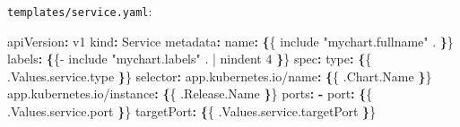 \documentclass[11pt]{article}
\newenvironment{Shaded}{\begin{snugshade}}{\end{snugshade}}
\newcommand{\AttributeTok}[1]{\textcolor[rgb]{0.16,0.50,0.73}{#1}}
\newcommand{\FunctionTok}[1]{\textcolor[rgb]{0.56,0.27,0.68}{#1}}
\newcommand{\KeywordTok}[1]{\textcolor[rgb]{0.81,0.81,0.76}{\textbf{#1}}}
\newcommand{\StringTok}[1]{\textcolor[rgb]{0.96,0.31,0.31}{#1}}
\begin{document}
\begin{Shaded}
\end{Shaded}

\texttt{templates/service.yaml}:


\begin{Shaded}
\begin{Highlighting}[]
\FunctionTok{apiVersion}\KeywordTok{:}\AttributeTok{ v1}
\FunctionTok{kind}\KeywordTok{:}\AttributeTok{ Service}
\FunctionTok{metadata}\KeywordTok{:}
\AttributeTok{  }\FunctionTok{name}\KeywordTok{:}\AttributeTok{ }\KeywordTok{\{}\AttributeTok{\{ include }\StringTok{"mychart.fullname"}\AttributeTok{ . }\KeywordTok{\}}\AttributeTok{\}}
\AttributeTok{  }\FunctionTok{labels}\KeywordTok{:}
\AttributeTok{    }\KeywordTok{\{}\AttributeTok{\{{-} include }\StringTok{"mychart.labels"}\AttributeTok{ . | nindent 4 }\KeywordTok{\}}\AttributeTok{\}}
\FunctionTok{spec}\KeywordTok{:}
\AttributeTok{  }\FunctionTok{type}\KeywordTok{:}\AttributeTok{ }\KeywordTok{\{}\AttributeTok{\{ .Values.service.type }\KeywordTok{\}}\AttributeTok{\}}
\AttributeTok{  }\FunctionTok{selector}\KeywordTok{:}
\AttributeTok{    }\FunctionTok{app.kubernetes.io/name}\KeywordTok{:}\AttributeTok{ }\KeywordTok{\{}\AttributeTok{\{ .Chart.Name }\KeywordTok{\}}\AttributeTok{\}}
\AttributeTok{    }\FunctionTok{app.kubernetes.io/instance}\KeywordTok{:}\AttributeTok{ }\KeywordTok{\{}\AttributeTok{\{ .Release.Name }\KeywordTok{\}}\AttributeTok{\}}
\AttributeTok{  }\FunctionTok{ports}\KeywordTok{:}
\AttributeTok{    }\KeywordTok{{-}}\AttributeTok{ }\FunctionTok{port}\KeywordTok{:}\AttributeTok{ }\KeywordTok{\{}\AttributeTok{\{ .Values.service.port }\KeywordTok{\}}\AttributeTok{\}}
\AttributeTok{      }\FunctionTok{targetPort}\KeywordTok{:}\AttributeTok{ }\KeywordTok{\{}\AttributeTok{\{ .Values.service.targetPort }\KeywordTok{\}}\AttributeTok{\}}
\end{Highlighting}
\end{Shaded}
\end{document}
